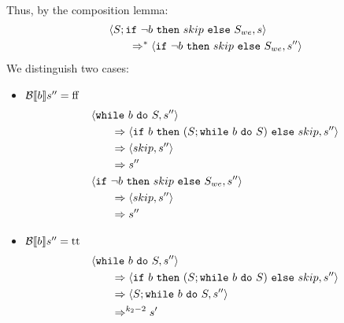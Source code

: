 \begin{exercise}
\begin{enumerate}
\begin{itemize}
\begin{itemize}
\begin{itemize}
\begin{gather*}
                                    \end{gather*}
                                    Thus, by the composition lemma:
                                    \begin{align*}
                                        &\left<S; \texttt{if}\ \neg b\ \texttt{then}\ skip\ \texttt{else}\ S_{we}, s\right>
                                        \\&\qquad\Rightarrow^* \left<\texttt{if}\ \neg b\ \texttt{then}\ skip\ \texttt{else}\ S_{we}, s''\right>
                                    \end{align*}
                                    We distinguish two cases:
                                    \begin{itemize}
                                        \item $\mathcal{B} \llbracket b \rrbracket s'' = \text{ff}$
                                            \begin{align*}
                                                &\left<\texttt{while}\ b\ \texttt{do}\ S, s''\right>
                                                \\&\qquad\Rightarrow \left<\texttt{if}\ b\ \texttt{then}\ (S; \texttt{while}\ b\ \texttt{do}\ S)\ \texttt{else}\ skip, s''\right>
                                                \\&\qquad\Rightarrow \left<skip, s''\right>
                                                \\&\qquad\Rightarrow s''
                                                \\
                                                &\left<\texttt{if}\ \neg b\ \texttt{then}\ skip\ \texttt{else}\ S_{we}, s''\right>
                                                \\&\qquad\Rightarrow \left<skip, s''\right>
                                                \\&\qquad\Rightarrow s''
                                            \end{align*}
                                        \item $\mathcal{B} \llbracket b \rrbracket s'' = \text{tt}$
                                            \begin{align*}
                                                &\instr{\wwhile{b}{S}}{s''}
                                                \\&\qquad\Rightarrow \instr{\wif{b}{(S; \wwhile{b}{S})}{skip}}{s''}
                                                \\&\qquad\Rightarrow \instr{S; \wwhile{b}{S}}{s''}
                                                \\&\qquad\Rightarrow^{k_2-2} s'

\end{align*}
\end{itemize}
\end{itemize}
\end{itemize}
\end{itemize}
\end{enumerate}
\end{exercise}
